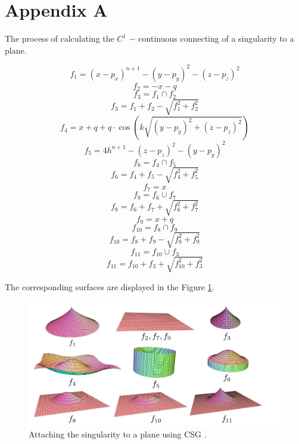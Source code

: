 \chapter*{Appendix A}
\label{appA}
The process of calculating the $C^1$ $-$ continuous connecting of a singularity to 
a plane.

$$f_1 = (x - p_x)^{n+1} - (y - p_y)^2 - (z - p_z)^2$$
$$f_2 = - x - q$$
$$f_3 = f_1 \cap f_2$$
$$f_3 = f_1+f_2-\sqrt{f_1^2+f_2^2}$$
$$f_4 = x + q + q \cdot \cos\left(k \sqrt{(y - p_y)^2 + (z - p_z)^2}\right)$$
$$f_5 = 4 h^{n+1} - (z - p_z)^2 - (y - p_y)^2$$
$$f_6 = f_4 \cap f_5$$
$$f_6 = f_4+f_5-\sqrt{f_4^2+f_5^2}$$
$$f_7 = x$$
$$f_8 = f_6 \cup f_7$$
$$f_8 = f_6 + f_7 + \sqrt{f_6^2+f_7^2}$$
$$f_9 = x+q$$
$$f_{10} = f_8 \cap f_9$$
$$f_{10} = f_8 + f_9 - \sqrt{f_8^2+f_9^2}$$
$$f_{11} = f_{10} \cup f_3$$
$$f_{11} = f_{10} + f_3 + \sqrt{f_{10}^2+f_3^2}$$

The corresponding surfaces are displayed in the Figure \ref{img:27}.

\begin{figure}
    \centerline{\includegraphics[scale=0.5]{images/img27}}
    \caption[Attaching the singularity to a plane using CSG]
    {Attaching the singularity to a plane using CSG \cite{calcplot3d}.}
    \label{img:27}
\end{figure}

